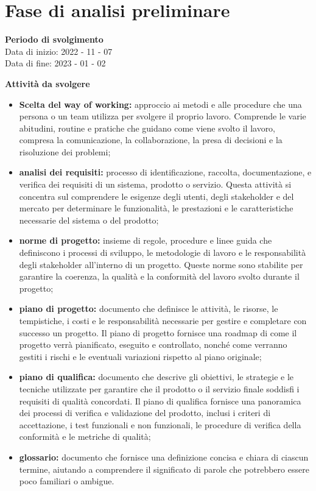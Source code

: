 \section{Fase di analisi preliminare}

\textbf{Periodo di svolgimento}
\\ Data di inizio: 2022 - 11 - 07 \\ Data di fine: 2023 - 01 - 02

\textbf{Attività da svolgere}
    \begin{itemize}
        \item \textbf{Scelta del way of working:} approccio ai metodi e alle procedure che una persona o un team utilizza per svolgere il proprio lavoro. Comprende le varie abitudini, routine e pratiche che guidano come viene svolto il lavoro, compresa la comunicazione, la collaborazione, la presa di decisioni e la risoluzione dei problemi;
        \item \textbf{analisi dei requisiti:} processo di identificazione, raccolta, documentazione, e verifica dei requisiti di un sistema, prodotto o servizio. Questa attività si concentra sul comprendere le esigenze degli utenti, degli stakeholder e del mercato per determinare le funzionalità, le prestazioni e le caratteristiche necessarie del sistema o del prodotto;
        \item \textbf{norme di progetto:} insieme di regole, procedure e linee guida che definiscono i processi di sviluppo, le metodologie di lavoro e le responsabilità degli stakeholder all'interno di un progetto. Queste norme sono stabilite per garantire la coerenza, la qualità e la conformità del lavoro svolto durante il progetto;
        \item \textbf{piano di progetto:} documento che definisce le attività, le risorse, le tempistiche, i costi e le responsabilità necessarie per gestire e completare con successo un progetto. Il piano di progetto fornisce una roadmap di come il progetto verrà pianificato, eseguito e controllato, nonché come verranno gestiti i rischi e le eventuali variazioni rispetto al piano originale;        \item \textbf{piano di qualifica:} documento che descrive gli obiettivi, le strategie e le tecniche utilizzate per garantire che il prodotto o il servizio finale soddisfi i requisiti di qualità concordati. Il piano di qualifica fornisce una panoramica dei processi di verifica e validazione del prodotto, inclusi i criteri di accettazione, i test funzionali e non funzionali, le procedure di verifica della conformità e le metriche di qualità;
        \item \textbf{glossario:} documento che fornisce una definizione concisa e chiara di ciascun termine, aiutando a comprendere il significato di parole che potrebbero essere poco familiari o ambigue.
    \end{itemize}

